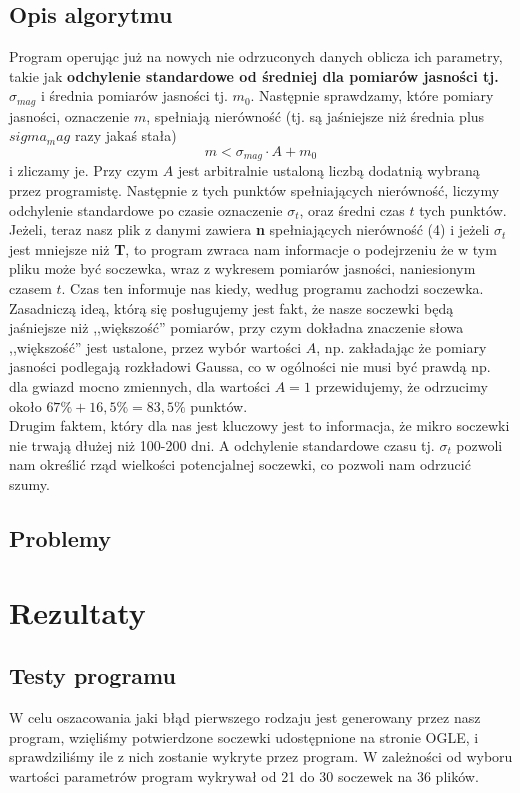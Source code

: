 \documentclass[a4paper,11pt]{article}
\newcommand{\ak}{\hspace{0.7 cm}}
\begin{document}
\subsection{Opis algorytmu}
\ak Program operując już na nowych nie odrzuconych danych oblicza ich parametry, takie jak \textbf{odchylenie standardowe od średniej dla pomiarów jasności tj.  $\sigma_{mag}$} i średnia pomiarów jasności tj. $m_0$. Następnie  sprawdzamy, które pomiary jasności, oznaczenie $m$, spełniają nierówność (tj. są jaśniejsze niż średnia plus $sigma_mag$ razy jakaś stała)
\begin{equation}
m<\sigma_{mag}\cdot A+m_0
\end{equation}  i zliczamy je. Przy czym $A$ jest arbitralnie ustaloną liczbą dodatnią wybraną przez programistę. Następnie z tych punktów spełniających nierówność, liczymy odchylenie standardowe po czasie oznaczenie $\sigma_t$, oraz średni czas $t$ tych punktów.
\\
\ak Jeżeli, teraz nasz plik z danymi zawiera \textbf{{n}} spełniających nierówność (4) i jeżeli $\sigma_t$ jest mniejsze niż \textbf{T}, to program zwraca nam informacje o podejrzeniu że w tym pliku może być soczewka, wraz z wykresem pomiarów jasności, naniesionym czasem $t$. Czas ten informuje nas kiedy, według programu zachodzi soczewka.
\\
\ak Zasadniczą ideą, którą się posługujemy jest fakt, że nasze soczewki będą jaśniejsze niż ,,większość'' pomiarów, przy czym dokładna znaczenie słowa ,,większość'' jest ustalone, przez wybór wartości $A$, np. zakładając że pomiary jasności podlegają rozkładowi Gaussa, co w ogólności nie musi być prawdą np. dla gwiazd mocno zmiennych, dla wartości $A=1$ przewidujemy, że odrzucimy około $67\%+16,5\%=83,5\%$ punktów. 
\\ 
\ak Drugim faktem, który dla nas jest kluczowy jest to informacja, że mikro soczewki nie trwają dłużej niż 100-200 dni. A odchylenie standardowe czasu tj. $\sigma_t$ pozwoli nam określić rząd wielkości potencjalnej soczewki, co pozwoli nam odrzucić szumy.  
\subsection{Problemy}
\section{Rezultaty}
\subsection{Testy programu }
W celu oszacowania jaki błąd pierwszego rodzaju jest generowany przez nasz program, wzięliśmy potwierdzone soczewki udostępnione na stronie OGLE, i sprawdziliśmy ile z nich zostanie wykryte przez program. W zależności od wyboru wartości parametrów program wykrywał od 21 do 30 soczewek na 36 plików.

\end{document}
